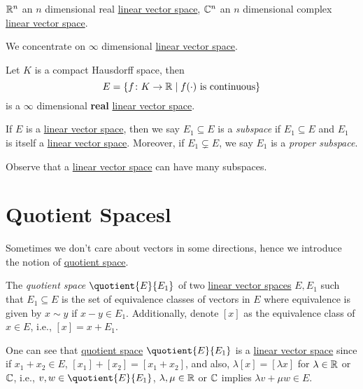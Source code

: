 \begin{eg}
	\(\mathbb{\MakeUppercase{r}} ^n\) an \(n\) dimensional real \hyperref[def:linear-vector-space]{linear vector space}, \(\mathbb{\MakeUppercase{c}} ^n\) an \(n\) dimensional complex \hyperref[def:linear-vector-space]{linear vector space}.
\end{eg}

We concentrate on \(\infty \) dimensional \hyperref[def:linear-vector-space]{linear vector space}.

\begin{eg}
	Let \(K\) is a compact Hausdorff space, then
	\[
		E = \left\{ f\colon K\to \mathbb{\MakeUppercase{r}} \mid f(\cdot) \text{ is continuous}  \right\}
	\]
	is a \(\infty\) dimensional \textbf{real} \hyperref[def:linear-vector-space]{linear vector space}.
\end{eg}

\begin{notation}[Subspace]
	If \(E\) is a \hyperref[def:linear-vector-space]{linear vector space}, then we say \(E_1 \subseteq E\) is a \emph{subspace} if \(E_1 \subseteq E\) and \(E_1\) is itself a \hyperref[def:linear-vector-space]{linear vector space}. Moreover, if \(E_1 \subsetneq E\), we say \(E_1\) is a \emph{proper subspace}.
\end{notation}

Observe that a \hyperref[def:linear-vector-space]{linear vector space} can have many subspaces.

\section{Quotient Spacesl}
Sometimes we don't care about vectors in some directions, hence we introduce the notion of \hyperref[def:quotient-space]{quotient space}.

\begin{definition}\label{def:quotient-space}
	The \emph{quotient space} \(\quotient{E}{E_1} \) of two \hyperref[def:linear-vector-space]{linear vector spaces} \(E, E_1\) such that \(E_1 \subseteq E\) is the set of equivalence classes of vectors in \(E\) where equivalence is given by \(x\sim y\) if \(x - y\in E_1\). Additionally, denote \([x]\) as the equivalence class of \(x\in E\), i.e., \([x] = x + E_1\).
\end{definition}

One can see that \hyperref[def:quotient-space]{quotient space} \(\quotient{E}{E_1} \) is a \hyperref[def:linear-vector-space]{linear vector space} since if \(x_1 + x_2\in E\), \([x_1] + [x_2] = [x_1 + x_2]\), and also, \(\lambda [x] = [\lambda x]\) for \(\lambda \in \mathbb{\MakeUppercase{r}} \) or \(\mathbb{\MakeUppercase{c}} \), i.e., \(v, w\in \quotient{E}{E_1} \), \(\lambda , \mu \in\mathbb{\MakeUppercase{r}} \) or \(\mathbb{\MakeUppercase{c}} \) implies \(\lambda v + \mu w\in E\).

